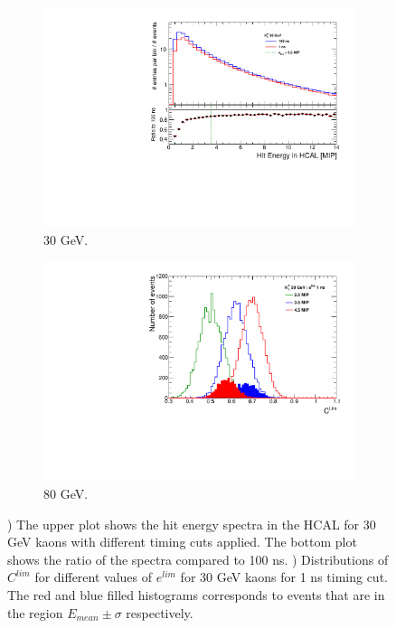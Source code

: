 \begin{figure}[htbp!]
  \centering
  \begin{subfigure}[t]{0.49\textwidth}
    \centering
    \includegraphics[width=1\linewidth]{../Thesis_Plots/ILD/AdditionalPlots/Plots/HitEnergySpectra_Comparison_30GeV.pdf}
    \caption{30 GeV.} \label{fig:HitSpectra30_timingcuts}
  \end{subfigure}
  \hfill
  \begin{subfigure}[t]{0.49\textwidth}
    \centering
    \includegraphics[width=1\linewidth]{../Thesis_Plots/ILD/AdditionalPlots/Plots/CLim_1ns_30GeV.pdf}
    \caption{80 GeV.} \label{fig:CLim30_1ns}
  \end{subfigure}
  \caption{) The upper plot shows the hit energy spectra in the HCAL for 30 GeV kaons with different timing cuts applied. The bottom plot shows the ratio of the spectra compared to 100 ns. ) Distributions of $C^{lim}$ for different values of $e^{lim}$ for 30 GeV kaons for 1 ns timing cut. The red and blue filled histograms corresponds to events that are in the region $E_{mean} \pm \sigma$ respectively.}
\end{figure}

